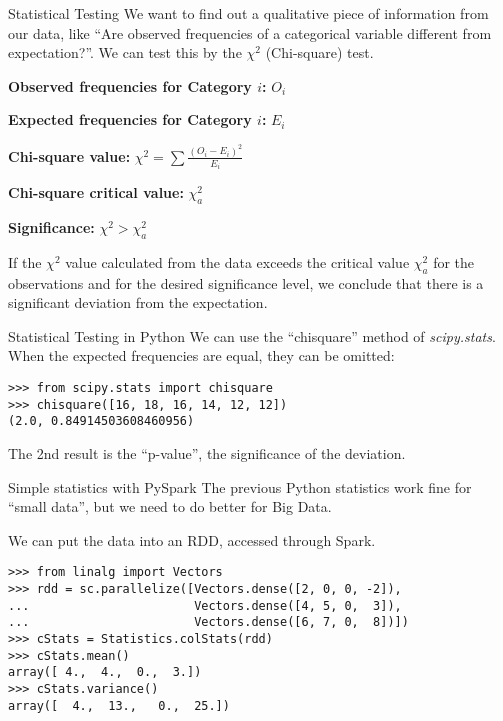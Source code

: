 \documentclass[bigger]{beamer}
\begin{document}
\begin{frame}{Statistical Testing}
We want to find out a qualitative piece of information from our data,
like 
``Are observed frequencies of a categorical variable different from expectation?''. 
We can test this by the $\chi^2$ (Chi-square) test.
\begin{description}
\item{\bf Observed frequencies for Category $i$:} \(O_i\) 
\item{\bf Expected frequencies for Category $i$:} \(E_i\) 
\item{\bf Chi-square value:} \(\chi^2 = \sum\frac{(O_i - E_i)^2}{E_i}\) 
\item{\bf Chi-square critical value:} \(\chi^2_a\)
\item{\bf Significance:}  \(\chi^2 > \chi^2_a\)
\end{description}
If the $\chi^2$ value calculated from the data exceeds the critical
value $\chi^2_a$  for the observations and for the
desired significance level, we conclude that
there is a significant deviation from the expectation.
\end{frame}


\begin{frame}[fragile]{Statistical Testing in Python}
We can use the ``chisquare'' method of {\em scipy.stats}.
When the expected frequencies are equal, they can be omitted:
\begin{verbatim}
>>> from scipy.stats import chisquare
>>> chisquare([16, 18, 16, 14, 12, 12])
(2.0, 0.84914503608460956)
\end{verbatim}
The 2nd result is the ``p-value'', the significance of the deviation.
\end{frame}


\begin{frame}[fragile]{Simple statistics with PySpark}
The previous Python statistics work fine for ``small data'', 
but we need to do better for Big Data.  

We can put the data into an RDD, accessed through Spark.
\begin{verbatim}
>>> from linalg import Vectors
>>> rdd = sc.parallelize([Vectors.dense([2, 0, 0, -2]),
...                       Vectors.dense([4, 5, 0,  3]),
...                       Vectors.dense([6, 7, 0,  8])])
>>> cStats = Statistics.colStats(rdd)
>>> cStats.mean()
array([ 4.,  4.,  0.,  3.])
>>> cStats.variance()
array([  4.,  13.,   0.,  25.])
\end{verbatim}
\end{frame}
\end{document}

